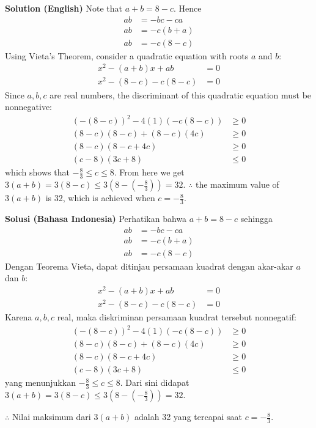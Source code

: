 
\begin{solusi}
\textbf{Solution (English)}
Note that $a+b = 8-c$. Hence
\begin{align*}
    ab &= -bc-ca\\
    ab &= -c(b+a)\\
    ab &= -c(8-c)
\end{align*}
Using Vieta's Theorem, consider a quadratic equation with roots $a$ and $b$:
\begin{align*}
    x^2 - (a+b)x + ab &= 0\\
    x^2 - (8-c) - c(8-c) &= 0
\end{align*}
Since $a,b,c$ are real numbers, the discriminant of this quadratic equation must be nonnegative:
\begin{align*}
    (-(8-c))^2 - 4(1)(-c(8-c)) &\ge 0\\
    (8-c)(8-c) + (8-c)(4c) &\ge 0\\
    (8-c)(8-c+4c) &\ge 0\\
    (c-8)(3c+8) &\le 0
\end{align*}
which shows that $-\frac{8}{3} \le c \le 8$.
From here we get $3(a+b) = 3(8-c) \le 3(8-(-\frac{8}{3})) = 32$.
$\therefore$ the maximum value of $3(a + b)$ is 32, which is achieved when $c=-\frac{8}{3}$.

\textbf{Solusi (Bahasa Indonesia)}
Perhatikan bahwa $a+b = 8-c$ sehingga
\begin{align*}
    ab &= -bc-ca\\
    ab &= -c(b+a)\\
    ab &= -c(8-c)
\end{align*}
Dengan Teorema Vieta, dapat ditinjau persamaan kuadrat dengan akar-akar $a$ dan $b$:
\begin{align*}
    x^2 - (a+b)x + ab &= 0\\
    x^2 - (8-c) - c(8-c) &= 0
\end{align*}
Karena $a,b,c$ real, maka diskriminan persamaan kuadrat tersebut nonnegatif:
\begin{align*}
    (-(8-c))^2 - 4(1)(-c(8-c)) &\ge 0\\
    (8-c)(8-c) + (8-c)(4c) &\ge 0\\
    (8-c)(8-c+4c) &\ge 0\\
    (c-8)(3c+8) &\le 0
\end{align*}
yang menunjukkan $-\frac{8}{3} \le c \le 8$.
Dari sini didapat $3(a+b) = 3(8-c) \le 3(8-(-\frac{8}{3})) = 32$.

$\therefore$ Nilai maksimum dari $3(a + b)$ adalah 32 yang tercapai saat $c=-\frac{8}{3}$.
\end{solusi}